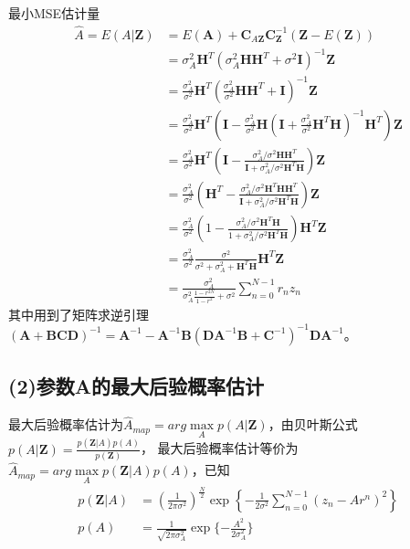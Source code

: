 \documentclass[fontset=windows]{article}
\numberwithin{figure}{section}
\begin{document}
最小MSE估计量
\begin{align*}
    \hat{A}=E(A|\mathbf{Z})
     & =E(\mathbf{A})+\mathbf{C}_{A\mathbf{Z}}\mathbf{C}_{\mathbf{Z}}^{-1}(\mathbf{Z}-E(\mathbf{Z}))                 \\
     & =\sigma_A^2\mathbf{H}^T(\sigma^2_A\mathbf{HH}^T+\sigma^2\mathbf{I})^{-1}\mathbf{Z}                            \\
     & =\frac{\sigma_A^2}{\sigma^2}\mathbf{H}^T(\frac{\sigma_A^2}{\sigma^2}\mathbf{HH}^T+\mathbf{I})^{-1}\mathbf{Z}  \\
     & =\frac{\sigma_A^2}{\sigma^2}\mathbf{H}^T(\mathbf{I}-\frac{\sigma_A^2}{\sigma^2}\mathbf{H}
    (\mathbf{I}+\frac{\sigma_A^2}{\sigma^2}\mathbf{H}^T\mathbf{H})^{-1}\mathbf{H}^T)\mathbf{Z}                       \\
     & =\frac{\sigma_A^2}{\sigma^2}\mathbf{H}^T(\mathbf{I}-\frac{\sigma_A^2/\sigma^2\mathbf{H}\mathbf{H}^T}
    {\mathbf{I}+\sigma_A^2/\sigma^2\mathbf{H}^T\mathbf{H}})\mathbf{Z}                                                \\
     & =\frac{\sigma_A^2}{\sigma^2}(\mathbf{H}^T-\frac{\sigma_A^2/\sigma^2\mathbf{H}^T\mathbf{H}\mathbf{H}^T}
    {\mathbf{I}+\sigma_A^2/\sigma^2\mathbf{H}^T\mathbf{H}})\mathbf{Z}                                                \\
     & =\frac{\sigma_A^2}{\sigma^2}(1-\frac{\sigma_A^2/\sigma^2\mathbf{H}^T\mathbf{H}}
    {1+\sigma_A^2/\sigma^2\mathbf{H}^T\mathbf{H}})\mathbf{H}^T\mathbf{Z}                                             \\
     & =\frac{\sigma_A^2}{\sigma^2}\frac{\sigma^2}{\sigma^2+\sigma^2_A+\mathbf{H}^T\mathbf{H}}\mathbf{H}^T\mathbf{Z} \\
     & =\frac{\sigma^2_A}{\sigma^2_A\frac{1-r^{2N}}{1-r^2}+\sigma^2}\sum_{n=0}^{N-1}r_nz_n
\end{align*}
其中用到了矩阵求逆引理\((\mathbf{A}+\mathbf{BCD})^{-1}=\mathbf{A}^{-1}-\mathbf{A}^{-1}\mathbf{B}(\mathbf{DA}^{-1}\mathbf{B}+\mathbf{C}^{-1})^{-1}\mathbf{DA}^{-1}\)。
\subsection*{(2)参数A的最大后验概率估计}

最大后验概率估计为\(\hat{A}_{map}=arg\underset{A}{\max}p(A|\mathbf{Z})\)，由贝叶斯公式\(p(A|\mathbf{Z})=\frac{p(\mathbf{Z}|A)p(A)}{p(\mathbf{Z})}\)，
最大后验概率估计等价为\(\hat{A}_{map}=arg\underset{A}{\max}p(\mathbf{Z}|A)p(A)\)，已知
\begin{align*}
    p(\mathbf{Z}|A) & =(\frac{1}{2\pi \sigma^2})^{\frac{N}{2}}\exp\left\{-\frac{1}{2\sigma^2}\sum_{n=0}^{N-1}(z_n-Ar^n)^2\right\} \\
    p(A)            & =\frac{1}{\sqrt{2\pi \sigma^2_A}}\exp\{-\frac{A^2}{2\sigma^2_A}\}
\end{align*}
\end{document}
